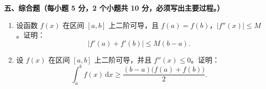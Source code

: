 \documentclass[a4paper,11pt]{ctexart}
\newcommand{\dd}{\,\mathrm{d}}
\begin{document}
\vspace{1.0em}

\textbf{五、综合题（每小题 5 分，2 个小题共 10 分，必须写出主要过程。）}

\begin{enumerate}[label=\arabic*., start=19, leftmargin=2em, itemsep=1.0em, topsep=0.6em]
  \item 设函数 $f(x)$ 在区间 $[a,b]$ 上二阶可导，且 $f(a)=f(b)$，$|f''(x)|\le M$。证明：
  \[
    |f'(a)+f'(b)|\le M(b-a).
  \]

  \item 设 $f(x)$ 在区间 $[a,b]$ 上二阶可导，并且 $f''(x)\le 0$。证明：
  \[
    \int_a^b f(x)\dd x \ge \frac{(b-a)\bigl(f(a)+f(b)\bigr)}{2}.
  \]
\end{enumerate}
\end{document}
